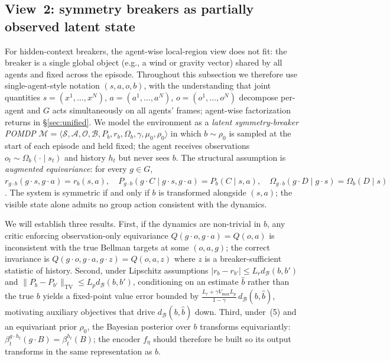 \documentclass[11pt]{article}
\begin{document}
\subsection{View~2: symmetry breakers as partially observed latent state}
For hidden-context breakers, the agent-wise local-region view does not fit: the breaker is a single global object (e.g., a wind or gravity vector) shared by all agents and fixed across the episode. Throughout this subsection we therefore use single-agent-style notation $(s, a, o, b)$, with the understanding that joint quantities $s = (x^1,\dots,x^N)$, $a = (a^1,\dots,a^N)$, $o = (o^1,\dots,o^N)$ decompose per-agent and $G$ acts simultaneously on all agents' frames; agent-wise factorization returns in \S\ref{sec:unified}. We model the environment as a \emph{latent symmetry-breaker POMDP} $\mathcal{M} = \langle \mathcal{S}, \mathcal{A}, \mathcal{O}, \mathcal{B}, P_b, r_b, \Omega_b, \gamma, \mu_0, \rho_0\rangle$ in which $b \sim \rho_0$ is sampled at the start of each episode and held fixed; the agent receives observations $o_t \sim \Omega_b(\cdot \mid s_t)$ and history $h_t$ but never sees $b$.
The structural assumption is \emph{augmented equivariance}: for every $g \in G$,
$
r_{g\cdot b}(g\!\cdot\!s, g\!\cdot\!a) = r_b(s,a), \quad
P_{g\cdot b}(g\!\cdot\!C \mid g\!\cdot\!s, g\!\cdot\!a) = P_b(C \mid s,a), \quad
\Omega_{g\cdot b}(g\!\cdot\!D \mid g\!\cdot\!s) = \Omega_b(D \mid s)
$.
The system is symmetric if and only if $b$ is transformed alongside $(s,a)$; the visible state alone admits no group action consistent with the dynamics.

We will establish three results. First, if the dynamics are non-trivial in $b$, any critic enforcing observation-only equivariance $Q(g\!\cdot\!o, g\!\cdot\!a) = Q(o,a)$ is inconsistent with the true Bellman targets at some $(o,a,g)$; the correct invariance is $Q(g\!\cdot\!o, g\!\cdot\!a, g\!\cdot\!z) = Q(o, a, z)$ where $z$ is a breaker-sufficient statistic of history. Second, under Lipschitz assumptions $|r_b - r_{b'}| \le L_r d_\mathcal{B}(b, b')$ and $\|P_b - P_{b'}\|_{\text{TV}} \le L_p d_\mathcal{B}(b, b')$, conditioning on an estimate $\widehat{b}$ rather than the true $b$ yields a fixed-point value error bounded by $\tfrac{L_r + \gamma V_{\max} L_p}{1-\gamma}\,d_\mathcal{B}(b, \widehat{b})$, motivating auxiliary objectives that drive $d_\mathcal{B}(b, \widehat{b})$ down. Third, under~(5) and an equivariant prior $\rho_0$, the Bayesian posterior over $b$ transforms equivariantly: $\beta^{g \cdot h_t}_t(g \cdot B) = \beta^{h_t}_t(B)$; the encoder $f_\eta$ should therefore be built so its output transforms in the same representation as $b$.
\end{document}
